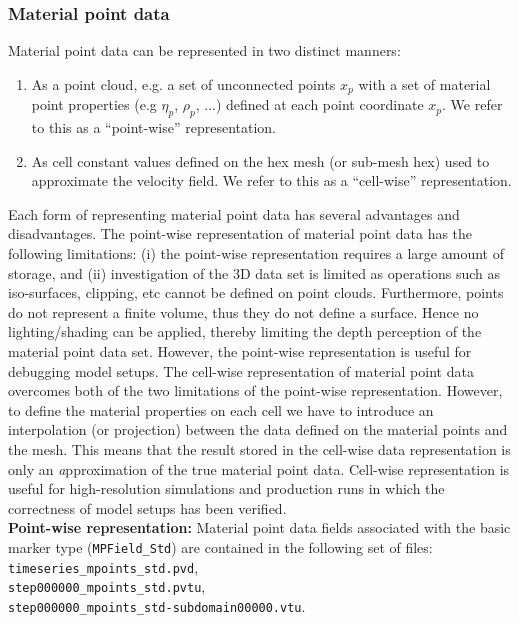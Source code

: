 \documentclass[paper=a4, fontsize=11pt,twoside]{scrartcl}
\newcommand{\unix}[1]{\texttt{\footnotesize #1}}
\begin{document}
{{\subsubsection{Material point data}
Material point data can be represented in two distinct manners: 
\begin{enumerate}
	\item As a point cloud, e.g. a set of unconnected points $x_p$ with a set of material point properties (e.g $\eta_p$, $\rho_p$, ...) defined at each point coordinate $x_p$. 
	We refer to this as a ``point-wise'' representation.
	\item As cell constant values defined on the hex mesh (or sub-mesh hex) used to approximate the velocity field. 
	We refer to this as a ``cell-wise'' representation.
\end{enumerate}
Each form of representing material point data has several advantages and disadvantages.
The point-wise representation of material point data has the following limitations: (i) the point-wise representation requires a large amount of storage, and (ii) investigation of the 3D data set is limited as operations such as iso-surfaces, clipping, etc cannot be defined on point clouds. Furthermore, points do not represent a finite volume, thus they do not define a surface. Hence no lighting/shading can be applied, thereby limiting the depth perception of the material point data set. However, the point-wise representation is useful for debugging model setups. The cell-wise representation of material point data overcomes both of the two limitations of the point-wise representation. However, to define the material properties on each cell we have to introduce an interpolation (or projection) between the data defined on the material points and the mesh. This means that the result stored in the cell-wise data representation is only an {\textit approximation} of the true material point data. Cell-wise representation is useful for high-resolution simulations and production runs in which the correctness of model setups has been verified.
\\[8pt]
{\bf Point-wise representation:} Material point data fields associated with the basic marker type (\unix{MPField\_Std}) are contained in the following set of files: \\
\unix{timeseries\_mpoints\_std.pvd}, \\
\unix{step000000\_mpoints\_std.pvtu}, \\
\unix{step000000\_mpoints\_std-subdomain00000.vtu}. \\
}}
\end{document}
